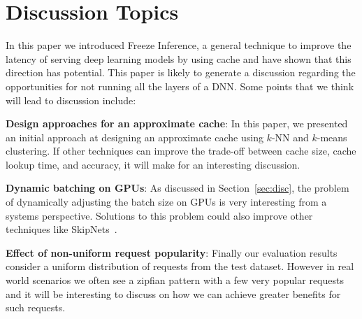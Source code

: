 \documentclass[letterpaper,twocolumn,10pt]{article}
\begin{document}
\begin{comment}
\subsection{Application in Edge Computing}
Freeze Inference opens up new opportunities to split the inference computation between an edge device and the cloud. A possible approach would be to split the DNN such that the computation for a few initial layers happens on the edge device, while computation for the remaining layers can be offloaded to the cloud. Freeze Inference provides the framework to complement the computation at the with a cache and ensure that cache hits are maximized at the edge.
\end{comment} 



\section{Discussion Topics}
In this paper we introduced Freeze Inference, a general technique to improve the latency of serving deep learning models by using cache and have shown that this direction has potential. This paper is likely to generate a discussion regarding the opportunities for not running all the layers of a DNN. Some points that we think will lead to discussion include:

\noindent\textbf{Design approaches for an approximate cache}: In this paper, we presented an initial approach at designing an approximate cache using $k$-NN and $k$-means clustering. If other techniques can improve the trade-off between cache size, cache lookup time, and accuracy, it will make for an interesting discussion.

\noindent\textbf{Dynamic batching on GPUs}: As discussed in Section~\ref{sec:disc}, the problem of dynamically adjusting the batch size on GPUs is very interesting from a systems perspective. Solutions to this problem could also improve other techniques like SkipNets~\cite{DBLP:journals/corr/abs-1711-09485}.

\noindent\textbf{Effect of non-uniform request popularity}: Finally our evaluation results consider a uniform distribution of requests from the test dataset. However in real world scenarios we often see a zipfian pattern with a few very popular requests and it will be interesting to discuss on how we can achieve greater benefits for such requests. \\ 
{

 
}
\end{document}
